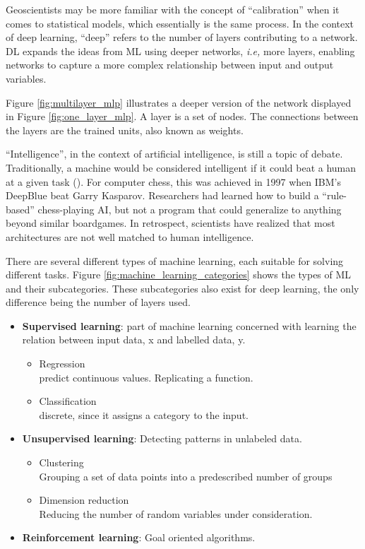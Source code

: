 Geoscientists may be more familiar with the concept of ``calibration'' when it comes to statistical models, which essentially is the same process. In the context of deep learning, ``deep'' refers to the number of layers contributing to a network. DL expands the ideas from ML using deeper networks, \textit{i.e,} more layers, enabling networks to capture a more complex relationship between input and output variables.


Figure \ref{fig:multilayer_mlp} illustrates a deeper version of the network displayed in Figure \ref{fig:one_layer_mlp}. A layer is a set of nodes. The connections between the layers are the trained units, also known as weights. 

``Intelligence'', in the context of artificial intelligence, is still a topic of debate. Traditionally, a machine would be considered intelligent if it could beat a human at a given task (\cite{Chollet2019OnIntelligence}). For computer chess, this was achieved in 1997 when IBM's DeepBlue beat Garry Kasparov. Researchers had learned how to build a ``rule-based'' chess-playing AI, but not a program that could generalize to anything beyond similar boardgames. In retrospect, scientists have realized that most architectures are not well matched to human intelligence. 

There are several different types of machine learning, each suitable for solving different tasks. Figure \ref{fig:machine_learning_categories} shows the types of ML and their subcategories. These subcategories also exist for deep learning, the only difference being the number of layers used.
 

\begin{itemize}
    \item \textbf{Supervised learning}: part of machine learning concerned with learning the relation between input data, x and labelled data, y.
    \begin{itemize}
        \item Regression\\predict continuous values. Replicating a function.
        \item Classification\\discrete, since it assigns a category to the input.
    \end{itemize}
    \item \textbf{Unsupervised learning}: Detecting patterns in unlabeled data.
    \begin{itemize}
        \item Clustering\\Grouping a set of data points into a predescribed number of groups
        \item Dimension reduction\\Reducing the number of random variables under consideration.
    \end{itemize}
    \item \textbf{Reinforcement learning}: Goal oriented algorithms.
\end{itemize}

